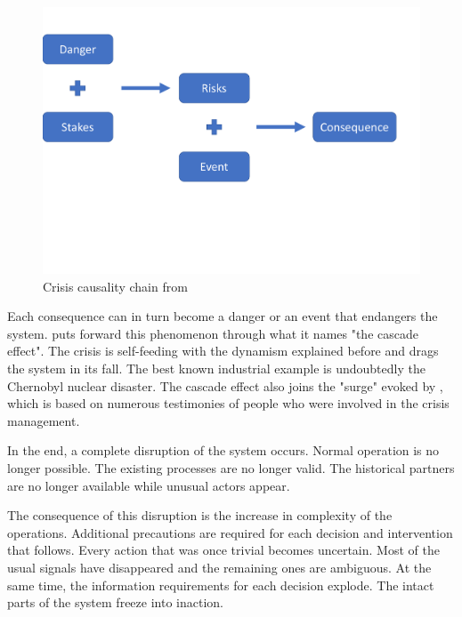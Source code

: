 \begin{figure}
    \centering
    \includegraphics[width=\textwidth]{figures/chap-1/fred-consequences-framework.pdf}
    \caption{Crisis causality chain from \textcite{benabenCollaborativeSystemsCrisis2014}}
    \label{context:fred-framework}
\end{figure}

Each consequence can in turn become a danger or an event that endangers the system.
\textcite{fertierInterpretationAutomatiqueDonnees2018} puts forward this phenomenon through what it names "the cascade effect".
The crisis is self-feeding with the dynamism explained before and drags the system in its fall.
The best known industrial example is undoubtedly the Chernobyl nuclear disaster.
The cascade effect also joins the "surge" evoked by \textcite{lagadecGESTIONCRISES1994}, which is based on numerous testimonies of people who were involved in the crisis management.

In the end, a complete disruption of the system occurs.
Normal operation is no longer possible. The existing processes are no longer valid.
The historical partners are no longer available while unusual actors appear.

The consequence of this disruption is the increase in complexity of the operations.
Additional precautions are required for each decision and intervention that follows.
Every action that was once trivial becomes uncertain.
Most of the usual signals have disappeared and the remaining ones are ambiguous.
At the same time, the information requirements for each decision explode.
The intact parts of the system freeze into inaction.

